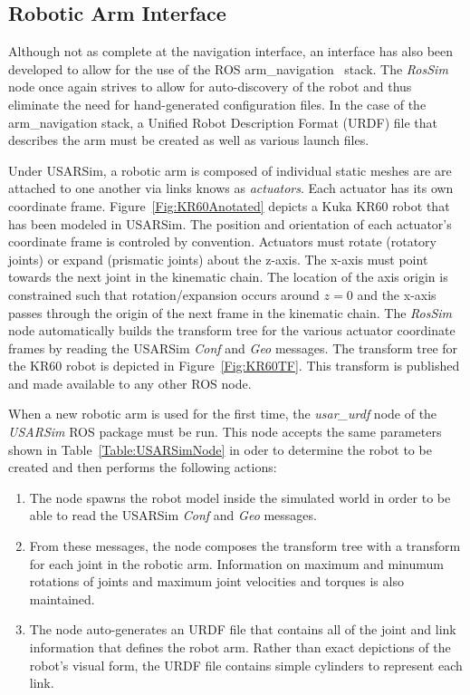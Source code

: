 \subsection*{Robotic Arm Interface}
Although not as complete at the navigation interface, an interface has also been developed to allow for the use of the ROS arm\_navigation~\cite{Sucan2010} stack. The {\it RosSim} node once again strives to allow for auto-discovery of the robot and thus eliminate the need for hand-generated configuration files. In the case of the arm\_navigation stack, a Unified Robot Description Format (URDF) file that describes the arm must be created as well as various launch files. 

Under USARSim, a robotic arm is composed of individual static meshes are are attached to one another via  links knows as {\it actuators}. Each actuator has its own coordinate frame. Figure~\ref{Fig:KR60Anotated} depicts a Kuka KR60 robot that has been modeled in USARSim. The position and orientation of each actuator's coordinate frame is controled by convention. Actuators must rotate (rotatory joints) or expand (prismatic joints) about the z-axis. The x-axis must point towards the next joint in the kinematic chain. The location of the axis origin is constrained such that rotation/expansion occurs around $z=0$ and the x-axis passes through the origin of the next frame in the kinematic chain. The {\it RosSim} node automatically builds the transform tree for the various actuator coordinate frames by reading the USARSim {\it Conf} and {\it Geo} messages. The transform tree for the KR60 robot is depicted in Figure~\ref{Fig:KR60TF}. This transform is published and made available to any other ROS node.

When a new robotic arm is used for the first time, the {\it usar\_urdf} node of the {\it USARSim} ROS package must be run. This node accepts the same parameters shown in Table~\ref{Table:USARSimNode} in oder to determine the robot to be created and then performs the following actions:
\begin{enumerate}
\item The node spawns the robot model inside the simulated world in order to be able to read the USARSim  {\it Conf} and {\it Geo} messages.
\item From these messages, the node composes the transform tree with a transform for each joint in the robotic arm. Information on maximum and minumum rotations of joints and maximum joint velocities and torques is also maintained.
\item The node auto-generates an URDF file that contains all of the joint and link information that defines the robot arm. Rather than exact depictions of the robot's visual form, the URDF file contains simple cylinders to represent each link.
\end{enumerate}


